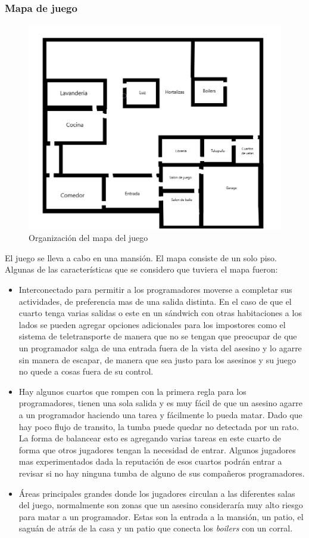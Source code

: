 \subsubsection{Mapa de juego}
\begin{figure}[h]
    \centering
    \includegraphics[width=1\linewidth]{images/MapaJuego.png}
    \caption{Organización del mapa del juego}
    \label{fig:mapa_juego}
\end{figure}
El juego se lleva a cabo en una mansión. El mapa consiste de un solo piso. Algunas de las características que se considero que tuviera el mapa fueron:
\begin{itemize}
    \item Interconectado para permitir a los programadores moverse a completar sus actividades, de preferencia mas de una salida distinta. En el caso de que el cuarto tenga varias salidas o este en un sándwich con otras habitaciones a los lados se pueden agregar opciones adicionales para los impostores como el sistema de teletransporte de manera que no se tengan que preocupar de que un programador salga de una entrada fuera de la vista del asesino y lo agarre sin manera de escapar, de manera que sea justo para los asesinos y su juego no quede a cosas fuera de su control.
    \item Hay algunos cuartos que rompen con la primera regla para los programadores, tienen una sola salida y es muy fácil de que un asesino agarre a un programador haciendo una tarea y fácilmente lo pueda matar. Dado que hay poco flujo de transito, la tumba puede quedar no detectada por un rato. La forma de balancear esto es agregando varias tareas en este cuarto de forma que otros jugadores tengan la necesidad de entrar. Algunos jugadores mas experimentados dada la reputación de esos cuartos podrán entrar a revisar si no hay ninguna tumba de alguno de sus compañeros programadores.
    \item Áreas principales grandes donde los jugadores circulan a las diferentes salas del juego, normalmente son zonas que un asesino consideraría muy alto riesgo para matar a un programador. Estas son la entrada a la mansión, un patio, el saguán de atrás de la casa y un patio que conecta los \textit{boilers} con un corral.
\end{itemize}

